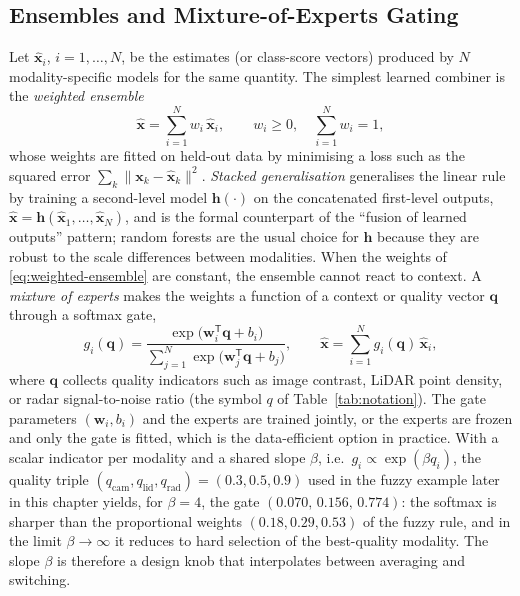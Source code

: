 \subsection{Ensembles and Mixture-of-Experts Gating}
\label{subsec:ensembles-moe}
Let $\widehat{\mathbf{x}}_i$, $i=1,\ldots,N$, be the estimates (or class-score vectors) produced by $N$ modality-specific models for the same quantity. The simplest learned combiner is the \emph{weighted ensemble}
\begin{equation}
\widehat{\mathbf{x}}=\sum_{i=1}^{N} w_i\,\widehat{\mathbf{x}}_i,\qquad w_i\ge 0,\quad \sum_{i=1}^{N}w_i=1,
\label{eq:weighted-ensemble}
\end{equation}
whose weights are fitted on held-out data by minimising a loss such as the squared error $\sum_k\|\mathbf{x}_k-\widehat{\mathbf{x}}_k\|^2$. \emph{Stacked generalisation} \cite{wolpert1992_stacking} generalises the linear rule by training a second-level model $\mathbf{h}(\cdot)$ on the concatenated first-level outputs, $\widehat{\mathbf{x}}=\mathbf{h}(\widehat{\mathbf{x}}_1,\ldots,\widehat{\mathbf{x}}_N)$, and is the formal counterpart of the ``fusion of learned outputs'' pattern; random forests \cite{breiman2001_rf} are the usual choice for $\mathbf{h}$ because they are robust to the scale differences between modalities. When the weights of \eqref{eq:weighted-ensemble} are constant, the ensemble cannot react to context. A \emph{mixture of experts} \cite{jacobs1991_moe} makes the weights a function of a context or quality vector $\mathbf{q}$ through a softmax gate,
\begin{equation}
g_i(\mathbf{q})=\frac{\exp\!\big(\mathbf{w}_i^{\mathsf T}\mathbf{q}+b_i\big)}{\sum_{j=1}^{N}\exp\!\big(\mathbf{w}_j^{\mathsf T}\mathbf{q}+b_j\big)},\qquad
\widehat{\mathbf{x}}=\sum_{i=1}^{N} g_i(\mathbf{q})\,\widehat{\mathbf{x}}_i ,
\label{eq:moe-gate}
\end{equation}
where $\mathbf{q}$ collects quality indicators such as image contrast, LiDAR point density, or radar signal-to-noise ratio (the symbol $q$ of Table~\ref{tab:notation}). The gate parameters $(\mathbf{w}_i,b_i)$ and the experts are trained jointly, or the experts are frozen and only the gate is fitted, which is the data-efficient option in practice. With a scalar indicator per modality and a shared slope $\beta$, i.e.\ $g_i\propto\exp(\beta q_i)$, the quality triple $(q_{\mathrm{cam}},q_{\mathrm{lid}},q_{\mathrm{rad}})=(0.3,0.5,0.9)$ used in the fuzzy example later in this chapter yields, for $\beta=4$, the gate $(0.070,\,0.156,\,0.774)$: the softmax is sharper than the proportional weights $(0.18,0.29,0.53)$ of the fuzzy rule, and in the limit $\beta\to\infty$ it reduces to hard selection of the best-quality modality. The slope $\beta$ is therefore a design knob that interpolates between averaging and switching.

